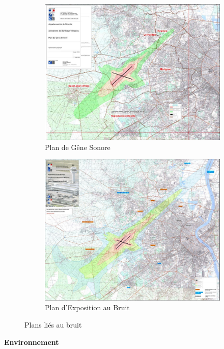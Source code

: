 \begin{figure}[hbt!]
  \begin{subfigure}{0.45\textwidth}
    \centering
    \includegraphics[width=.7\linewidth]{Images/pgs.png}  
    \caption{Plan de Gêne Sonore}
    \label{fig:pgs}
  \end{subfigure}
  \begin{subfigure}{0.45\textwidth}
    \centering
    \includegraphics[width=.7\linewidth]{Images/peb}\newline
    \caption{Plan d'Exposition au Bruit}
    \label{fig:peb}
  \end{subfigure}
  \caption{Plans liés au bruit}
\label{fig:plans}
\end{figure}



\textbf{Environnement}